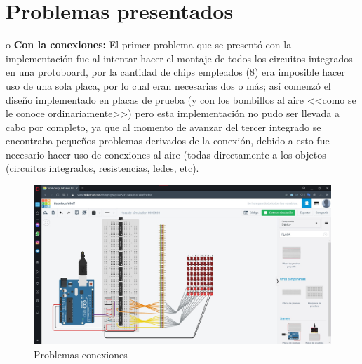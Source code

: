 \documentclass{article}
\begin{document}
\section{Problemas presentados} \label{contenido}
o	\textbf{Con la conexiones:} El primer problema que se presentó con la implementación fue al intentar hacer el montaje de todos los circuitos integrados en una protoboard, por la cantidad de chips empleados (8) era imposible hacer uso de una sola placa, por lo cual eran necesarias dos o más; así comenzó el diseño implementado en placas de prueba (y con los bombillos al aire <<como se le conoce ordinariamente>>) pero esta implementación no pudo ser llevada a cabo por completo, ya que al momento de avanzar del tercer integrado se encontraba pequeños problemas derivados de la conexión, debido a esto fue necesario hacer uso de conexiones al aire (todas directamente a los objetos (circuitos integrados, resistencias, ledes, etc).\par
\begin{figure}[h]
\includegraphics[width=12cm]{protoboard.jpg}
\centering
\caption{Problemas conexiones}
\label{fig:protoboard}
\end{figure}
\end{document}
